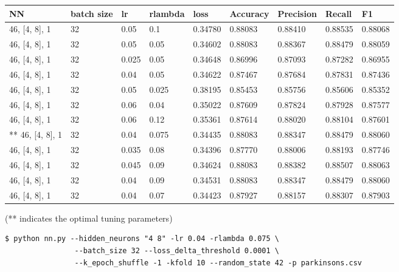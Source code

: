 \begin{tabular}{|l|l|l|l|l|l|l|l|l|}
    NN & batch size & lr & rlambda & loss & Accuracy & Precision & Recall & F1 \\ \hline
\hline
    46, [4, 8], 1 & 32 & 0.05 & 0.1 & 0.34780 & 0.88083 & 0.88410 & 0.88535 & 0.88068 \\
    46, [4, 8], 1 & 32 & 0.05 & 0.05 & 0.34602 & 0.88083 & 0.88367 & 0.88479 & 0.88059 \\
    46, [4, 8], 1 & 32 & 0.025 & 0.05 & 0.34648 & 0.86996 & 0.87093 & 0.87282 & 0.86955 \\
    46, [4, 8], 1 & 32 & 0.04 & 0.05 & 0.34622 & 0.87467 & 0.87684 & 0.87831 & 0.87436 \\
    46, [4, 8], 1 & 32 & 0.05 & 0.025 & 0.38195 & 0.85453 & 0.85756 & 0.85606 & 0.85352 \\
    46, [4, 8], 1 & 32 & 0.06 & 0.04 & 0.35022 & 0.87609 & 0.87824 & 0.87928 & 0.87577 \\
    46, [4, 8], 1 & 32 & 0.06 & 0.12 & 0.35361 & 0.87614 & 0.88020 & 0.88104 & 0.87601 \\
    ** 46, [4, 8], 1 & 32 & 0.04 & 0.075 & 0.34435 & 0.88083 & 0.88347 & 0.88479 & 0.88060 \\
    46, [4, 8], 1 & 32 & 0.035 & 0.08 & 0.34396 & 0.87770 & 0.88006 & 0.88193 & 0.87746 \\
    46, [4, 8], 1 & 32 & 0.045 & 0.09 & 0.34624 & 0.88083 & 0.88382 & 0.88507 & 0.88063 \\
    46, [4, 8], 1 & 32 & 0.04 & 0.09 & 0.34531 & 0.88083 & 0.88347 & 0.88479 & 0.88060 \\
    46, [4, 8], 1 & 32 & 0.04 & 0.07 & 0.34423 & 0.87927 & 0.88157 & 0.88307 & 0.87903 \\
\end{tabular}
(** indicates the optimal tuning parameters)


\begin{verbatim}
$ python nn.py --hidden_neurons "4 8" -lr 0.04 -rlambda 0.075 \
                --batch_size 32 --loss_delta_threshold 0.0001 \
                --k_epoch_shuffle -1 -kfold 10 --random_state 42 -p parkinsons.csv
\end{verbatim}

